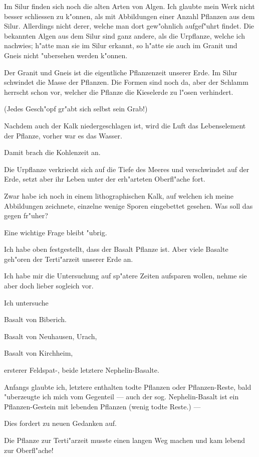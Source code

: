 \documentclass[a4paper, 11pt, oneside, german]{article}
\begin{document}
Im Silur finden sich noch die alten Arten von Algen. Ich glaubte mein Werk nicht besser schliessen zu k"onnen, als mit Abbildungen einer Anzahl Pflanzen aus dem Silur. Allerdings nicht derer, welche man dort gew"ohnlich aufgef"uhrt findet. Die bekannten Algen aus dem Silur sind ganz andere, als die Urpflanze, welche ich nachwies; h"atte man sie im Silur erkannt, so h"atte sie auch im Granit und Gneis nicht "ubersehen werden k"onnen.

Der Granit und Gneis ist die eigentliche Pflanzenzeit unserer Erde. Im Silur schwindet die Masse der Pflanzen. Die Formen sind noch da, aber der Schlamm herrscht schon vor, welcher die Pflanze die Kieselerde zu l"osen verhindert.

(Jedes Gesch"opf gr"abt sich selbst sein Grab!)

Nachdem auch der Kalk niedergeschlagen ist, wird die Luft das Lebenselement der Pflanze, vorher war es das Wasser.

Damit brach die Kohlenzeit an.

Die Urpflanze verkriecht sich auf die Tiefe des Meeres und verschwindet auf der Erde, setzt aber ihr Leben unter der erh"arteten Oberfl"ache fort.

Zwar habe ich noch in einem lithographischen Kalk, auf welchen ich meine Abbildungen zeichnete, einzelne wenige Sporen eingebettet gesehen. Was soll das gegen fr"uher?

Eine wichtige Frage bleibt "ubrig.

Ich habe oben festgestellt, dass der Basalt Pflanze ist. Aber viele Basalte geh"oren der Terti"arzeit unserer Erde an.

Ich habe mir die Untersuchung auf sp"atere Zeiten aufsparen wollen, nehme sie aber doch lieber sogleich vor.

Ich untersuche

Basalt von Biberich.

Basalt von Neuhausen, Urach,

Basalt von Kirchheim,

ersterer Feldspat-, beide letztere Nephelin-Basalte.

Anfangs glaubte ich, letztere enthalten todte Pflanzen oder Pflanzen-Reste, bald "uberzeugte ich mich vom Gegenteil --- auch der sog. Nephelin-Basalt ist ein Pflanzen-Gestein mit lebenden Pflanzen (wenig todte Reste.) ---

Dies fordert zu neuen Gedanken auf.

Die Pflanze zur Terti"arzeit musste einen langen Weg machen und kam lebend zur Oberfl"ache!
\end{document}
